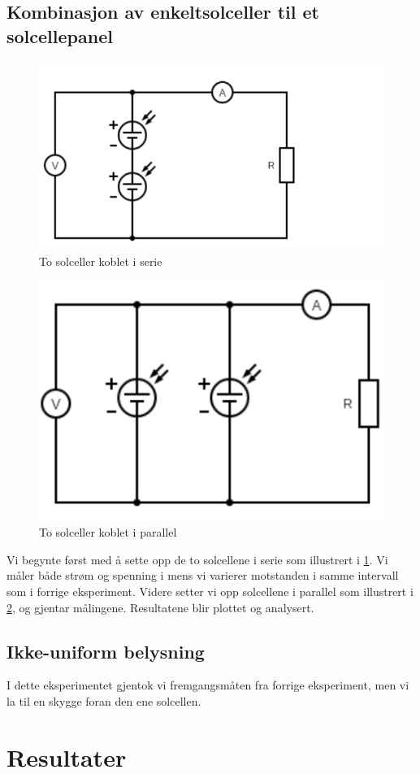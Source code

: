 \documentclass[reprint,norsk,notitlepage]{revtex4-2}
\begin{document}
\subsection{Kombinasjon av enkeltsolceller til et solcellepanel}
\begin{figure}[h!]
  \centering
  \includegraphics[width = .4\textwidth]{Solcelle_ser.png}
  \caption{To solceller koblet i serie}
  \label{fig: 3_ser}
\end{figure}

\begin{figure}[h!]
  \centering
  \includegraphics[width = .4\textwidth]{Solcelle_par.png}
  \caption{To solceller koblet i parallel}
  \label{fig: 3_par}
\end{figure}


Vi begynte først med å sette opp de to solcellene i serie som illustrert i \cref{fig: 3_ser}. Vi måler både strøm og spenning i mens vi varierer motstanden i samme intervall som i forrige eksperiment. 
Videre setter vi opp solcellene i parallel som illustrert i \cref{fig: 3_par}, og gjentar målingene. Resultatene blir plottet og analysert. 


\subsection{Ikke-uniform belysning}
I dette eksperimentet gjentok vi fremgangsmåten fra forrige eksperiment, men vi la til en skygge foran den ene solcellen. 

\section{Resultater} \label{sec: results}
\end{document}

